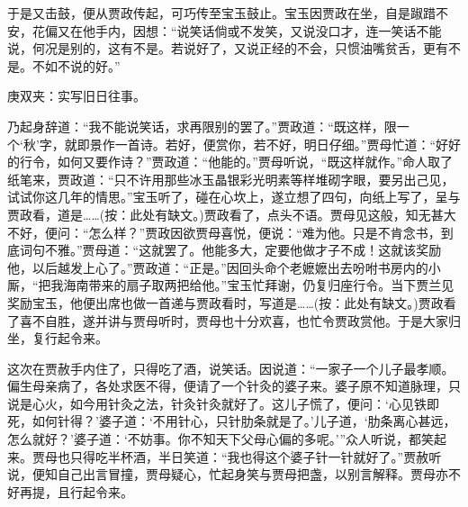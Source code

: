 \begin{parag}
    于是又击鼓，便从贾政传起，可巧传至宝玉鼓止。宝玉因贾政在坐，自是踧踖不安，花偏又在他手内，因想：“说笑话倘或不发笑，又说没口才，连一笑话不能说，何况是别的，这有不是。若说好了，又说正经的不会，只惯油嘴贫舌，更有不是。不如不说的好。”\begin{note}庚双夹：实写旧日往事。\end{note}乃起身辞道：“我不能说笑话，求再限别的罢了。”贾政道：“既这样，限一个‘秋’字，就即景作一首诗。若好，便赏你，若不好，明日仔细。”贾母忙道：“好好的行令，如何又要作诗？”贾政道：“他能的。”贾母听说，“既这样就作。”命人取了纸笔来，贾政道：“只不许用那些冰玉晶银彩光明素等样堆砌字眼，要另出己见，试试你这几年的情思。”宝玉听了，碰在心坎上，遂立想了四句，向纸上写了，呈与贾政看，道是……(按：此处有缺文。)贾政看了，点头不语。贾母见这般，知无甚大不好，便问：“怎么样？”贾政因欲贾母喜悦，便说：“难为他。只是不肯念书，到底词句不雅。”贾母道：“这就罢了。他能多大，定要他做才子不成！这就该奖励他，以后越发上心了。”贾政道：“正是。”因回头命个老嬷嬷出去吩咐书房内的小厮，“把我海南带来的扇子取两把给他。”宝玉忙拜谢，仍复归座行令。当下贾兰见奖励宝玉，他便出席也做一首递与贾政看时，写道是……(按：此处有缺文。)贾政看了喜不自胜，遂并讲与贾母听时，贾母也十分欢喜，也忙令贾政赏他。于是大家归坐，复行起令来。
\end{parag}


\begin{parag}
    这次在贾赦手内住了，只得吃了酒，说笑话。因说道：“一家子一个儿子最孝顺。偏生母亲病了，各处求医不得，便请了一个针灸的婆子来。婆子原不知道脉理，只说是心火，如今用针灸之法，针灸针灸就好了。这儿子慌了，便问：‘心见铁即死，如何针得？’婆子道：‘不用针心，只针肋条就是了。’儿子道，‘肋条离心甚远，怎么就好？’婆子道：‘不妨事。你不知天下父母心偏的多呢。’”众人听说，都笑起来。贾母也只得吃半杯酒，半日笑道：“我也得这个婆子针一针就好了。”贾赦听说，便知自己出言冒撞，贾母疑心，忙起身笑与贾母把盏，以别言解释。贾母亦不好再提，且行起令来。
\end{parag}


